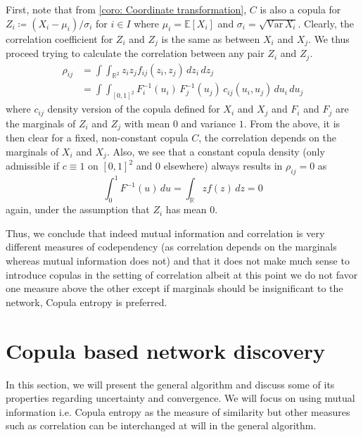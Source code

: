 \documentclass[../Thesis.tex]{subfiles}
\begin{document}
First, note that from \autoref{coro: Coordinate transformation}, $C$ is also a copula for $Z_i \coloneq \left( X_i - \mu_i\right) / \sigma_i$ for $i \in I$ where $\mu_i = \mathbb{E}[X_i]$ and $\sigma_i = \sqrt{\text{Var} \, X_i}$. Clearly, the correlation coefficient for $Z_i$ and $Z_j$ is the same as between $X_i$ and $X_j$. We thus proceed trying to calculate the correlation between any pair $Z_i$ and $Z_j$.
\begin{align*}
    \rho_{ij} & = \int\int_{\mathbb{R}^2} z_i z_j f_{ij}(z_i,z_j) \, dz_i \, dz_j                       \\
              & = \int\int_{[0,1]^2} F_i^{-1}(u_i) \, F_j^{-1}(u_j) \, c_{ij}(u_i, u_j) \, du_i \, du_j
\end{align*}
where $c_{ij}$ density version of the copula defined for $X_i$ and $X_j$ and $F_i$ and $F_j$ are the marginals of $Z_i$ and $Z_j$ with mean $0$ and variance $1$. From the above, it is then clear for a fixed, non-constant copula $C$, the correlation depends on the marginals of $X_i$ and $X_j$. Also, we see that a constant copula density (only admissible if $c \equiv 1$ on $[0,1]^2$ and $0$ elsewhere) always results in $\rho_{ij} = 0$ as
$$\int_0^1 F^{-1}(u) \, du = \int_{\mathbb{R}} z f(z) \, dz = 0$$
again, under the assumption that $Z_i$ has mean $0$.

Thus, we conclude that indeed mutual information and correlation is very different measures of codependency (as correlation depends on the marginals whereas mutual information does not) and that it does not make much sense to introduce copulas in the setting of correlation albeit at this point we do not favor one measure above the other except if marginals should be insignificant to the network, Copula entropy is preferred.






\section{Copula based network discovery}\label{sec:Copula based network discovery}
In this section, we will present the general algorithm and discuss some of its properties regarding uncertainty and convergence. We will focus on using mutual information i.e. Copula entropy as the measure of similarity but other measures such as correlation can be interchanged at will in the general algorithm.
\end{document}
